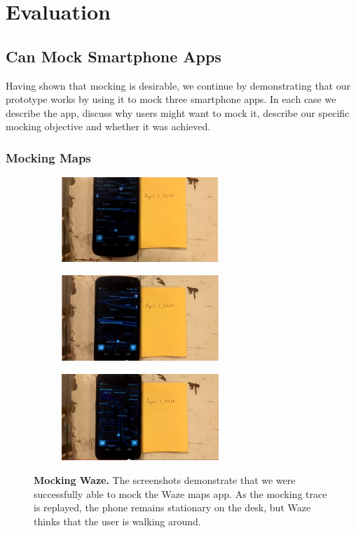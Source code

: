 \section{Evaluation}
\label{sec-evaluation}
\subsection{\PocketMocker{} Can Mock Smartphone Apps}
\label{subsec-mockingapps}

Having shown that mocking is desirable, we continue by demonstrating that our
\PocketMocker{} prototype works by using it to mock three smartphone apps. In
each case we describe the app, discuss why users might want to mock it,
describe our specific mocking objective and whether it was achieved.

\subsubsection{Mocking Maps}

\begin{figure}[t]

\begin{subfigure}[t]{2.33in}
\includegraphics[width=2.33in]{./figures/apps/waze/waze1.png}
\caption{}
\end{subfigure}%
\begin{subfigure}[t]{2.33in}
\includegraphics[width=2.33in]{./figures/apps/waze/waze2.png}
\caption{}
\end{subfigure}%
\begin{subfigure}[t]{2.33in}
\includegraphics[width=2.33in]{./figures/apps/waze/waze3.png}
\caption{}
\end{subfigure}%

\caption{\textbf{Mocking Waze.} The screenshots demonstrate that we were
successfully able to mock the Waze maps app. As the mocking trace is
replayed, the phone remains stationary on the desk, but Waze thinks that the
user is walking around.}

\label{fig-mocking-waze}

\end{figure}

